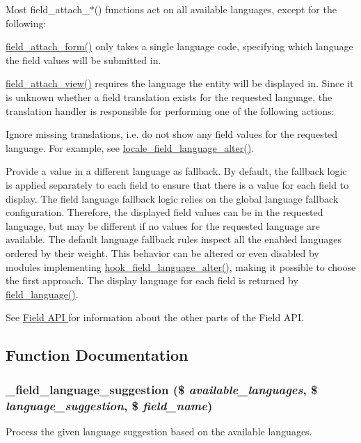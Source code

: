 Most field\_\-attach\_\-$\ast$() functions act on all available languages, except for the following:
\begin{DoxyItemize}
\item \hyperlink{group__field__attach_gac5bd0213dae78f7c1b3235f3acdde2c6}{field\_\-attach\_\-form()} only takes a single language code, specifying which language the field values will be submitted in.
\item \hyperlink{group__field__attach_gaa752a8fd31173fd2308d71eb059e00c7}{field\_\-attach\_\-view()} requires the language the entity will be displayed in. Since it is unknown whether a field translation exists for the requested language, the translation handler is responsible for performing one of the following actions:
\begin{DoxyItemize}
\item Ignore missing translations, i.e. do not show any field values for the requested language. For example, see \hyperlink{locale_8module_a2e2bf06bf347a63df595c58aad152428}{locale\_\-field\_\-language\_\-alter()}.
\item Provide a value in a different language as fallback. By default, the fallback logic is applied separately to each field to ensure that there is a value for each field to display. The field language fallback logic relies on the global language fallback configuration. Therefore, the displayed field values can be in the requested language, but may be different if no values for the requested language are available. The default language fallback rules inspect all the enabled languages ordered by their weight. This behavior can be altered or even disabled by modules implementing \hyperlink{group__field__attach_ga6411d5b5a528850a6e53c87ff899cabc}{hook\_\-field\_\-language\_\-alter()}, making it possible to choose the first approach. The display language for each field is returned by \hyperlink{group__field__language_gaff79088cd3951d2127adad1a2c13ad3e}{field\_\-language()}.
\end{DoxyItemize}
\end{DoxyItemize}

See \hyperlink{group__field}{Field API } for information about the other parts of the Field API. 

\subsection{Function Documentation}
\hypertarget{group__field__language_gaf7105831bb68e11809f92c990b50fb6c}{
\subsubsection[{\_\-field\_\-language\_\-suggestion}]{\setlength{\rightskip}{0pt plus 5cm}\_\-field\_\-language\_\-suggestion (\$ {\em available\_\-languages}, \/  \$ {\em language\_\-suggestion}, \/  \$ {\em field\_\-name})}}
\label{group__field__language_gaf7105831bb68e11809f92c990b50fb6c}
Process the given language suggestion based on the available languages.

